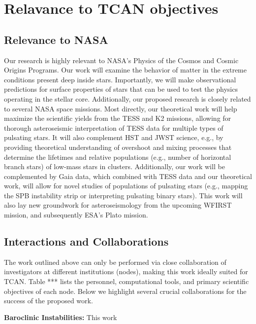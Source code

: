{\color{orange}

\section{Relavance to TCAN objectives}

}

\subsection{Relevance to NASA}

Our research is highly relevant to NASA's Physics of the Cosmos and Cosmic Origins Programs. Our work will examine the behavior of matter in the extreme conditions present deep inside stars. Importantly, we will make observational predictions for surface properties of stars that can be used to test the physics operating in the stellar core. Additionally, our proposed research is closely related to several NASA space missions. Most directly, our theoretical work will help maximize the scientific yields from the TESS and K2 missions, allowing for thorough asteroseismic interpretation of TESS data for multiple types of pulsating stars. It will also complement HST and JWST science, e.g., by providing theoretical understanding of overshoot and mixing processes that determine the lifetimes and relative populations (e.g., number of horizontal branch stars) of low-mass stars in clusters. Additionally, our work will be complemented by Gaia data, which combined with TESS data and our theoretical work, will allow for novel studies of populations of pulsating stars (e.g., mapping the SPB instability strip or interpreting pulsating binary stars). This work will also lay new groundwork for asteroseismology from the upcoming WFIRST mission, and subsequently ESA's Plato mission. 


\subsection{Interactions and Collaborations}

The work outlined above can only be performed via close collaboration of investigators at different institutions (nodes), making this work ideally suited for TCAN. Table *** lists the personnel, computational tools, and primary scientific objectives of each node. Below we highlight several crucial collaborations for the success of the proposed work.

{\bf Baroclinic Instabilities:} This work 

